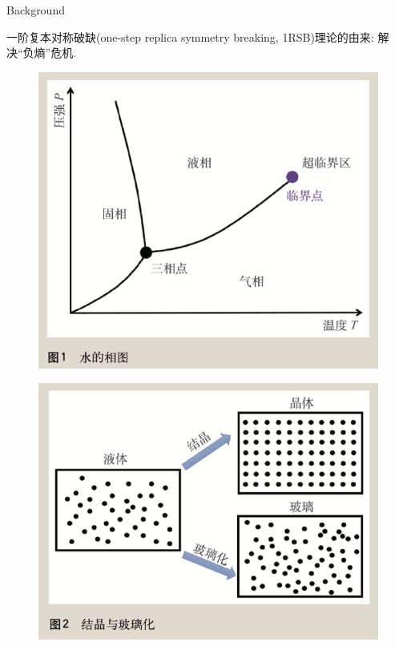 \documentclass[UTF8]{beamer}
\begin{document}
\begin{frame}{Background}
  \begin{minipage}[c]{1.0\linewidth}
    一阶复本对称破缺(one-step replica symmetry breaking, 1RSB)理论的由来: {\color{red} 解决``负熵''危机.}
  \end{minipage}
  \vfill
  \begin{minipage}[c]{0.3\linewidth}
    \begin{figure}
      \centering
      \includegraphics[width=0.8\linewidth]{./fig/水的相图.png}
    \end{figure}
  \end{minipage}
  \hfill
  \begin{minipage}[c]{0.3\linewidth}
    \begin{figure}
      \centering
      \includegraphics[width=0.9\linewidth]{./fig/结晶与玻璃化.png}
    \end{figure}

\end{minipage}
\end{frame}
\end{document}
